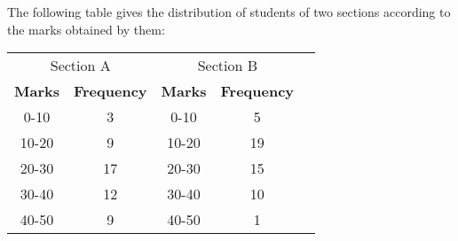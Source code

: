 % 
\item 

\solution

\item

\solution


%
% 
%
\item The following table gives the distribution of students of two sections according to
the marks obtained by them:\\

\begin{tabular}{|c|c|c|c|c|}
\hline
 \multicolumn{2}{c|}{Section A}  
    &\multicolumn{2}{c|}{Section B} \\
\cline{2-4}

 \textbf{Marks} &\textbf{Frequency} &\textbf{Marks} &\textbf{Frequency} \\
\hline
0-10 &3 &0-10 &5\\
10-20 &9 &10-20 &19\\
20-30 &17 &20-30 &15\\
30-40 &12 &30-40 &10\\
40-50 &9 &40-50 &1\\
\hline

\end{tabular}\\

